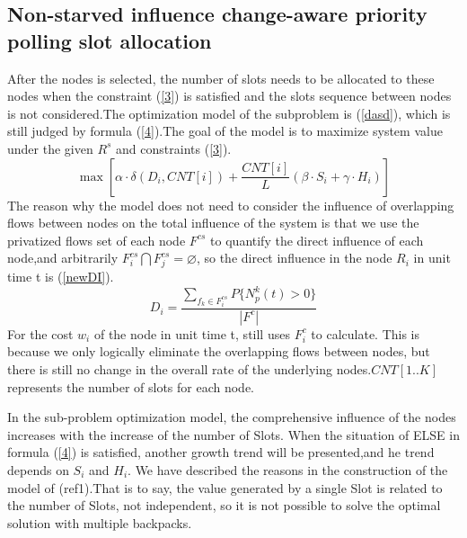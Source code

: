 \documentclass[conference]{IEEEtran}
\begin{document}
\subsection{Non-starved influence change-aware priority polling slot allocation}

After the nodes is selected, the number of slots needs to be allocated to these nodes when the constraint (\ref{3}) is satisfied and the slots sequence between nodes is not considered.The optimization model of the subproblem is (\ref{dasd}), which is still judged by formula (\ref{4}).The goal of the model is to maximize system value under the given $R^s$ and constraints (\ref{3}). 
\begin{equation}
\max [ \alpha \cdot \delta(D_i,CNT[i]) + \frac{CNT[i]}{L}(\beta \cdot S_i + \gamma \cdot H_i)  ]
\label{dasd}
\end{equation}
The reason why the model does not need to consider the influence of overlapping flows between nodes on the total influence of the system is that we use the privatized flows set of each node $F^{cs}$ to quantify the direct influence of each node,and arbitrarily $F^{cs}_i \bigcap F^{cs}_j = \varnothing$, so the direct influence in the node $R_i$ in unit time t is (\ref{newDI}).
\begin{equation}
{D}_i=\frac{\sum_{f_k \in F^{cs}_i} P\{N_p^k(t)> 0\}}{|F^c|} 
\label{newDI}
\end{equation}
For the cost $w_i$ of the node in unit time t, still uses $F_i^c$ to calculate. This is because we only logically eliminate the overlapping flows between nodes, but there is still no change in the overall rate of the underlying nodes.$CNT[1..K]$ represents the number of slots for each node.

In the sub-problem optimization model, the comprehensive influence of the nodes increases with the increase of the number of Slots. When the situation of ELSE in formula (\ref{4}) is satisfied, another growth trend will be presented,and he trend depends on $S_i$ and $H_i$. We have described the reasons in the construction of the model of (ref{1}).That is to say, the value generated by a single Slot is related to the number of Slots, not independent, so it is not possible to solve the optimal solution with multiple backpacks.
\end{document}
